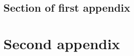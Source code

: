 \documentclass{mproj}
\begin{document}
\section{Section of first appendix}

\chapter{Second appendix}



\end{document}
